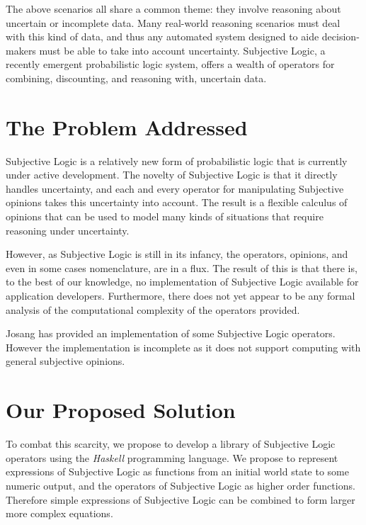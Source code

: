 \documentclass[thesis.tex]{subfiles}
\begin{document}
The above scenarios all share a common theme: they involve reasoning about uncertain or incomplete
data. Many real-world reasoning scenarios must deal with this kind of data, and thus any
automated system designed to aide decision-makers must be able to take into account uncertainty.
Subjective Logic, a recently emergent probabilistic logic system, offers a wealth of operators
for combining, discounting, and reasoning with, uncertain data.


%
%

%
%






\section{The Problem Addressed}

Subjective Logic is a relatively new form of probabilistic logic that is currently
under active development. The novelty of Subjective Logic is that it
directly handles uncertainty, and each and every operator for manipulating
Subjective opinions takes this uncertainty into account. The result is a
flexible calculus of opinions that can be used to model many kinds of
situations that require reasoning under uncertainty.

However, as Subjective Logic is still in its infancy, the operators, opinions, and
even in some cases nomenclature, are in a flux. The result of this is that
there is, to the best of our knowledge, no implementation of Subjective
Logic available for application developers. Furthermore, there does not
yet appear to be any formal analysis of the computational complexity of
the operators provided.

Josang has provided an implementation of some Subjective Logic operators.
However the implementation is incomplete as it does not support computing
with general subjective opinions.





\section{Our Proposed Solution}

To combat this scarcity, we propose to develop a library of Subjective Logic
operators using the \emph{Haskell} programming language. We propose to represent
expressions of Subjective Logic as functions from an initial world state to some
numeric output, and the operators of Subjective Logic as higher order functions.
Therefore simple expressions of Subjective Logic can be combined to form larger
more complex equations.
\end{document}
